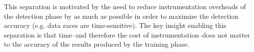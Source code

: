 \documentclass[letterpaper,twocolumn,10pt]{article}
\newcommand{\TextToolname}{Malcontent}
\newcommand{\Toolname}{\textsc{\TextToolname{}}}
\begin{document}
\begin{itemize}
This separation is motivated by the need to reduce instrumentation overheads of the detection phase by
as much as possible in order to maximize the detection accuracy (e.g. data races are time-sensitive). The key
insight enabling this separation is that time--and therefore the cost of instrumentation--does not matter to
the accuracy of the results produced by the training phase.


%
%


%


\end{itemize}
\end{document}
